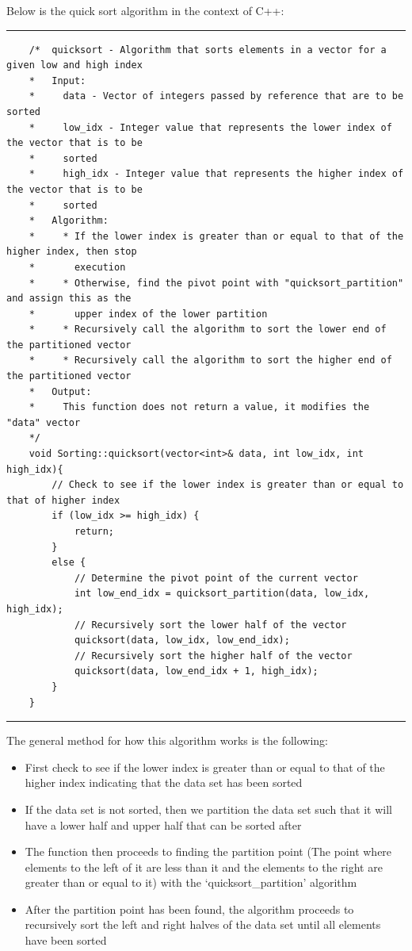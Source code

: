 \documentclass[a4paper,9pt]{article}
\newcommand{\horizontalline}{\noindent \rule{\textwidth}{0.5pt}\par}
\begin{document}
\begin{highlight}
    Below is the quick sort algorithm in the context of C++:

    \horizontalline

    \begin{verbatim}
    /*  quicksort - Algorithm that sorts elements in a vector for a given low and high index
    *   Input:
    *     data - Vector of integers passed by reference that are to be sorted
    *     low_idx - Integer value that represents the lower index of the vector that is to be 
    *     sorted
    *     high_idx - Integer value that represents the higher index of the vector that is to be 
    *     sorted
    *   Algorithm:
    *     * If the lower index is greater than or equal to that of the higher index, then stop 
    *       execution
    *     * Otherwise, find the pivot point with "quicksort_partition" and assign this as the 
    *       upper index of the lower partition
    *     * Recursively call the algorithm to sort the lower end of the partitioned vector
    *     * Recursively call the algorithm to sort the higher end of the partitioned vector
    *   Output:
    *     This function does not return a value, it modifies the "data" vector
    */
    void Sorting::quicksort(vector<int>& data, int low_idx, int high_idx){
        // Check to see if the lower index is greater than or equal to that of higher index
        if (low_idx >= high_idx) {
            return;
        }
        else {
            // Determine the pivot point of the current vector
            int low_end_idx = quicksort_partition(data, low_idx, high_idx);
            // Recursively sort the lower half of the vector
            quicksort(data, low_idx, low_end_idx);
            // Recursively sort the higher half of the vector
            quicksort(data, low_end_idx + 1, high_idx);
        }
    }
    \end{verbatim}

    \horizontalline

    The general method for how this algorithm works is the following:

    \begin{itemize}
        \item First check to see if the lower index is greater than or equal to that of the higher index indicating that the data set has been sorted
        \item If the data set is not sorted, then we partition the data set such that it will have a lower half and upper half that can be sorted after
        \item The function then proceeds to finding the partition point (The point where elements to the left of it are less than it and the elements to the right are greater than or equal to it)
        with the `quicksort\_partition' algorithm
        \item After the partition point has been found, the algorithm proceeds to recursively sort the left and right halves of the data set until all elements have been sorted
    \end{itemize}


\end{highlight}
\end{document}
